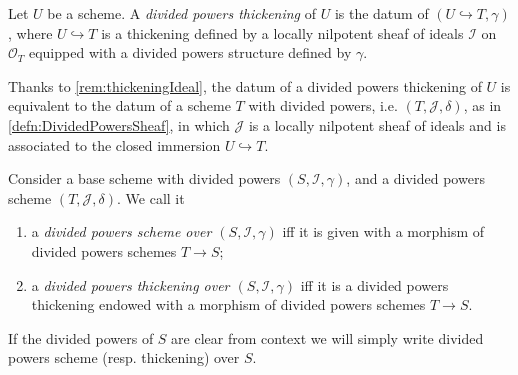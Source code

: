 \begin{defn}\label{defn:PDThickening}
	Let $U$ be a scheme. A {\em divided powers thickening} of $U$ 
	is the datum of $\left(U \hookrightarrow T, \gamma\right)$,
	where $U \hookrightarrow T$ is a thickening defined by a locally nilpotent
	sheaf of ideals $\mathcal{I}$ on $\mathcal{O}_T$ equipped
	with a divided powers structure defined by $\gamma$.
\end{defn}


\begin{rem}[]\label{rem:EquivPDThickening}
	Thanks to \cref{rem:thickeningIdeal}, the datum of a
	divided powers thickening of $U$ is equivalent to the datum of
	a scheme $T$ with divided powers, i.e.
	$\left(T, \mathcal{J}, \delta\right)$, as in \cref{defn:DividedPowersSheaf},
	in which $\mathcal{J}$ is a locally nilpotent sheaf of ideals
	and is associated to the closed immersion $U \hookrightarrow T$.
\end{rem}


\begin{defn}
	Consider a base scheme with divided powers
	$\left(S, \mathcal{I}, \gamma\right)$, and a divided powers
	scheme $\left(T, \mathcal{J}, \delta\right)$.
	We call it 
\begin{enumerate}
	\item a {\em divided powers scheme over $\left(S, \mathcal{I}, \gamma\right)$}
		iff it is given with a morphism of divided powers 
		schemes $T \to S$;

	\item a {\em divided powers thickening over $\left(S, \mathcal{I}, \gamma\right)$}
		iff it is a divided powers thickening endowed
		with a morphism of divided powers schemes $T \to S$.
\end{enumerate}
	If the divided powers of $S$ are clear from context we will
	simply write divided powers scheme (resp$.$ thickening) over $S$.
\end{defn}


